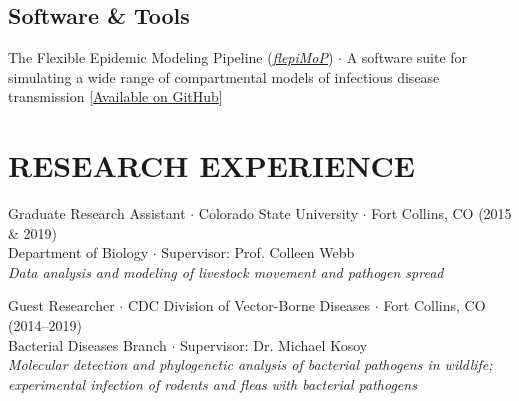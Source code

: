 \documentclass{cv}
\begin{document}




\subsection*{Software \& Tools}

The Flexible Epidemic Modeling Pipeline (\href{https://www.flepimop.org/}{\textit{flepiMoP}}) $\cdot$ A software suite for simulating a wide range of compartmental models of infectious disease transmission [\href{https://github.com/HopkinsIDD/flepiMoP}{Available on GitHub}]


\section*{RESEARCH EXPERIENCE}

Graduate Research Assistant $\cdot$ Colorado State University $\cdot$ Fort Collins, CO (2015 \& 2019) \\
Department of Biology $\cdot$ Supervisor: Prof. Colleen Webb \\
\textit{Data analysis and modeling of livestock movement and pathogen spread}

Guest Researcher $\cdot$ CDC Division of Vector-Borne Diseases $\cdot$ Fort Collins, CO (2014--2019) \\
Bacterial Diseases Branch $\cdot$ Supervisor: Dr. Michael Kosoy \\
\textit{Molecular detection and phylogenetic analysis of bacterial pathogens in wildlife; experimental infection of rodents and fleas with bacterial pathogens}
\end{document}
